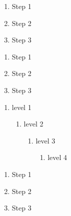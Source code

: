\begin{enumerate}

\item{Step 1}

\item{Step 2}

\item{Step 3}

\end{enumerate}


\begin{enumerate}

\item{Step 1}

\item{Step 2}

\item{Step 3}

\end{enumerate}


\begin{enumerate}

\item{level 1}

\begin{enumerate}

\item{level 2}

\begin{enumerate}

\item{level 3}

\begin{enumerate}

\item{level 4}

\end{enumerate}

\end{enumerate}

\end{enumerate}

\end{enumerate}


\begin{enumerate}

\item{Step 1}

\item{Step 2}

\item{Step 3}

\end{enumerate}


